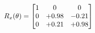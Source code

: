 \documentclass[preview]{standalone}
\begin{document}
\begin{align*}
\special{dvisvgm:raw <g id='unique000'>}R_{x}(\theta) = \begin{bmatrix}1 & 0 & 0 \\0 & +0.98 & -0.21 \\0 & +0.21 & +0.98\end{bmatrix}\special{dvisvgm:raw </g>}
\end{align*}
\end{document}

